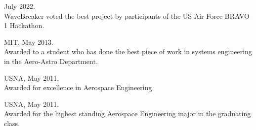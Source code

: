 \begin{enumerate}
     July 2022.
    \ifverbose\\WaveBreaker voted the best project by participants of
    the US Air Force BRAVO 1 Hackathon.\fi

     MIT, May 2013.
    \ifverbose\\Awarded to a student who has done the best piece of
    work in systems engineering in the Aero-Astro Department.\fi

     USNA, May 2011.
    \ifverbose\\Awarded for excellence in Aerospace Engineering.\fi

     USNA, May 2011.
    \ifverbose\\Awarded for the highest standing Aerospace
    Engineering major in the graduating class.\fi
\end{enumerate}
